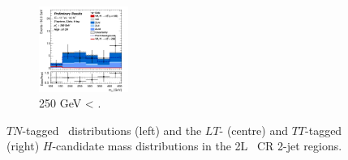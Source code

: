 \begin{figure}[h!]
\begin{subfigure}[b]{\textwidth}
        \includegraphics[width=0.32\textwidth]{Images/VH/Own_fit/postfit_VHcc/Region_distmBB_BMin250_DCRHigh_J2_TTypett_T2_L2_Y6051_GlobalFit_conditionnal_mu1.png}
        \caption{250 GeV < \ptv.}
        \label{fig:plots_VHcc_2L_250_CRH_2J}
    \end{subfigure}
    \caption{$TN$-tagged \ptv\ distributions (left) and the $LT$- (centre) and $TT$-tagged (right) $H$-candidate mass distributions in the 2L \highdr\ CR 2-jet regions.}
    \label{fig:plots_VHcc_2L_CRH_2J}
\end{figure}

\vspace*{\fill} \newpage
\vspace*{\fill} 

